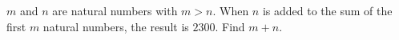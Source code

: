$m$ and $n$ are natural numbers with $m>n$. When $n$ is added to the sum of the first $m$ natural numbers, the result is $2300$. Find $m+n$.
